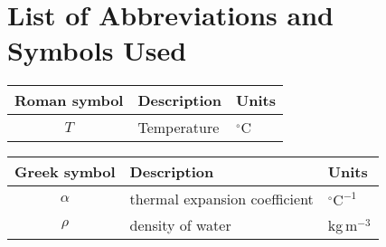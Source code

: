 \chapter*{List of Abbreviations and\\ \vspace{-0.5em} Symbols Used}

	\setlongtables
	\begin{longtable}{cll}
	\hline
	Roman symbol & Description & Units\\
	\hline
	\endhead
	\hline
	\endfoot
	$T$ & Temperature & $^\circ$C\\
\hline
\end{longtable}

	\setlongtables
\begin{longtable}{cll}
\hline
Greek symbol & Description & Units\\
\hline
\endhead
\hline
\endfoot
$\alpha$ & thermal expansion coefficient & $^\circ\textrm{C}^{-1}$\\
$\rho$ & density of water & kg\,m$^{-3}$\\
\hline
\end{longtable}


